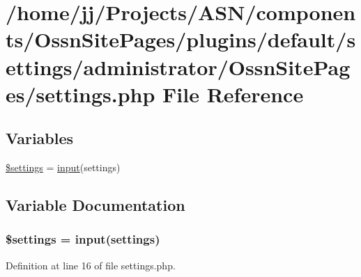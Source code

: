 \hypertarget{components_2_ossn_site_pages_2plugins_2default_2settings_2administrator_2_ossn_site_pages_2settings_8php}{}\section{/home/jj/\+Projects/\+A\+S\+N/components/\+Ossn\+Site\+Pages/plugins/default/settings/administrator/\+Ossn\+Site\+Pages/settings.php File Reference}
\label{components_2_ossn_site_pages_2plugins_2default_2settings_2administrator_2_ossn_site_pages_2settings_8php}
\subsection*{Variables}
\begin{DoxyCompactItemize}
\item 
\hyperlink{components_2_ossn_site_pages_2plugins_2default_2settings_2administrator_2_ossn_site_pages_2settings_8php_ac7c3353107070daa85f641882931b358}{\$settings} = \hyperlink{ossn_8lib_8input_8php_a64ebee98b041c4f75f71ed3cd73cc8ed}{input}(\textquotesingle{}settings\textquotesingle{})
\end{DoxyCompactItemize}


\subsection{Variable Documentation}
\subsubsection[{\texorpdfstring{\$settings}{$settings}}]{\setlength{\rightskip}{0pt plus 5cm}\$settings = {\bf input}(\textquotesingle{}settings\textquotesingle{})}\hypertarget{components_2_ossn_site_pages_2plugins_2default_2settings_2administrator_2_ossn_site_pages_2settings_8php_ac7c3353107070daa85f641882931b358}{}\label{components_2_ossn_site_pages_2plugins_2default_2settings_2administrator_2_ossn_site_pages_2settings_8php_ac7c3353107070daa85f641882931b358}


Definition at line 16 of file settings.\+php.

